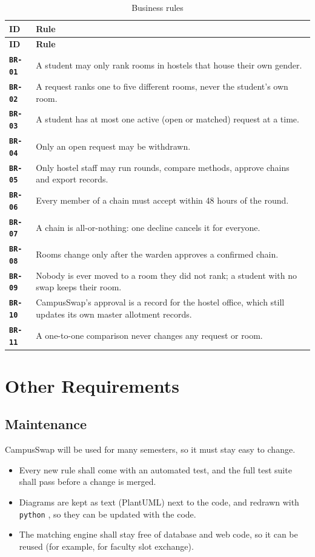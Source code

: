 \documentclass[11pt,a4paper,parskip=half,toc=listof]{scrreprt}
\newcommand{\Req}[1]{\textbf{\texttt{#1}}}
\begin{document}
\begin{xltabular}{\linewidth}{@{}L{1.4cm}Y@{}}
  \caption{Business rules}\label{tab:rules}\\
  \toprule
  \textbf{ID} & \textbf{Rule}\\
  \midrule
  \endfirsthead
  \toprule
  \textbf{ID} & \textbf{Rule}\\
  \midrule
  \endhead
  \bottomrule
  \endlastfoot
  \Req{BR-01} & A student may only rank rooms in hostels that house their
    own gender.\\
  \Req{BR-02} & A request ranks one to five different rooms, never the
    student's own room.\\
  \Req{BR-03} & A student has at most one active (open or matched) request
    at a time.\\
  \Req{BR-04} & Only an open request may be withdrawn.\\
  \Req{BR-05} & Only hostel staff may run rounds, compare methods, approve
    chains and export records.\\
  \Req{BR-06} & Every member of a chain must accept within 48 hours of the
    round.\\
  \Req{BR-07} & A chain is all-or-nothing: one decline cancels it for
    everyone.\\
  \Req{BR-08} & Rooms change only after the warden approves a confirmed
    chain.\\
  \Req{BR-09} & Nobody is ever moved to a room they did not rank; a student
    with no swap keeps their room.\\
  \Req{BR-10} & CampusSwap's approval is a record for the hostel office,
    which still updates its own master allotment records.\\
  \Req{BR-11} & A one-to-one comparison never changes any request or
    room.\\
\end{xltabular}

\chapter{Other Requirements}

\section{Maintenance}

CampusSwap will be used for many semesters, so it must stay easy to
change.
\begin{itemize}
  \item Every new rule shall come with an automated test, and the full
    test suite shall pass before a change is merged.
  \item Diagrams are kept as text (PlantUML) next to the code, and redrawn
    with \texttt{python} , so they can be updated with
    the code.
  \item The matching engine shall stay free of database and web code, so it
    can be reused (for example, for faculty slot exchange).
\end{itemize}
\end{document}

